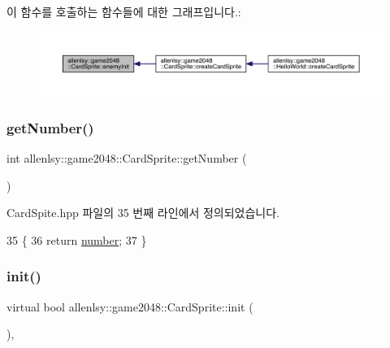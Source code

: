이 함수를 호출하는 함수들에 대한 그래프입니다.\+:
\nopagebreak
\begin{figure}[H]
\begin{center}
\leavevmode
\includegraphics[width=350pt]{d9/d22/classallenlsy_1_1game2048_1_1_card_sprite_afdf6cfc4ce73b460a30791de269f7f69_icgraph}
\end{center}
\end{figure}
\mbox{\label{classallenlsy_1_1game2048_1_1_card_sprite_ac483e81f56c1c7d08a83175061c8edb5}} 
\subsubsection{\texorpdfstring{get\+Number()}{getNumber()}}
{\footnotesize\ttfamily int allenlsy\+::game2048\+::\+Card\+Sprite\+::get\+Number (\begin{DoxyParamCaption}{ }\end{DoxyParamCaption})\hspace{0.3cm}{\ttfamily [inline]}}



Card\+Spite.\+hpp 파일의 35 번째 라인에서 정의되었습니다.


\begin{DoxyCode}
35                    \{
36     \textcolor{keywordflow}{return} \hyperlink{classallenlsy_1_1game2048_1_1_card_sprite_ad792455a70c4dee8eaf5da553be6f88e}{number};
37 \}
\end{DoxyCode}
\mbox{\label{classallenlsy_1_1game2048_1_1_card_sprite_ad6769d950c3b9b87092bd7e40d61dd4d}} 
\subsubsection{\texorpdfstring{init()}{init()}}
{\footnotesize\ttfamily virtual bool allenlsy\+::game2048\+::\+Card\+Sprite\+::init (\begin{DoxyParamCaption}{ }\end{DoxyParamCaption})\hspace{0.3cm}{\ttfamily [inline]}, {\ttfamily [virtual]}}



